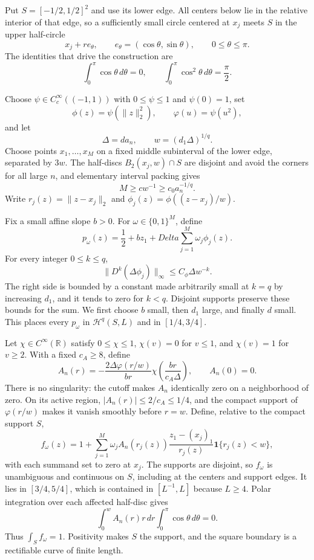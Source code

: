 Put \(S=[-1/2,1/2]^2\) and use its lower edge.  All centers below lie in the relative interior of that edge, so a sufficiently small circle centered at \(x_j\) meets \(S\) in the upper half-circle
\[
 x_j+r e_\theta,\qquad e_\theta=(\cos\theta,\sin\theta),
 \qquad 0\leq\theta\leq\pi.
\]
The identities that drive the construction are
\[
 \int_0^\pi\cos\theta\,d\theta=0,
 \qquad
 \int_0^\pi\cos^2\theta\,d\theta=\frac\pi2.
\]

Choose \(\psi\in C_c^\infty((-1,1))\) with \(0\leq\psi\leq1\) and \(\psi(0)=1\), set
\[
 \phi(z)=\psi(\lVert z\rVert_2^2),
 \qquad \varphi(u)=\psi(u^2),
\]
and let
\[
 \Delta=d a_n,
 \qquad w=(d_1\Delta)^{1/q}.
\]
Choose points \(x_1,\ldots,x_M\) on a fixed middle subinterval of the lower edge, separated by \(3w\).  The half-discs \(B_2(x_j,w)\cap S\) are disjoint and avoid the corners for all large \(n\), and elementary interval packing gives
\[
 M\geq c w^{-1}\geq c_0a_n^{-1/q}.
\]
Write \(r_j(z)=\lVert z-x_j\rVert_2\) and \(\phi_j(z)=\phi((z-x_j)/w)\).

Fix a small affine slope \(b>0\).  For \(\omega\in\{0,1\}^M\), define
\[
 p_\omega(z)=\frac12+bz_1+Delta\sum_{j=1}^M\omega_j\phi_j(z).
\]
For every integer \(0\leq k\leq q\),
\[
 \lVert D^k(\Delta\phi_j)\rVert_\infty
 \leq C_\phi\Delta w^{-k}.
\]
The right side is bounded by a constant made arbitrarily small at \(k=q\) by increasing \(d_1\), and it tends to zero for \(k<q\).  Disjoint supports preserve these bounds for the sum.  We first choose \(b\) small, then \(d_1\) large, and finally \(d\) small.  This places every \(p_\omega\) in \(\mathcal H^q(S,L)\) and in \([1/4,3/4]\).

Let \(\chi\in C^\infty(\mathbb R)\) satisfy \(0\leq\chi\leq1\), \(\chi(v)=0\) for \(v\leq1\), and \(\chi(v)=1\) for \(v\geq2\).  With a fixed \(c_A\geq8\), define
\[
 A_n(r)=-\frac{2\Delta\varphi(r/w)}{br}
 \chi\!\left(\frac{br}{c_A\Delta}\right),
 \qquad A_n(0)=0.
\]
There is no singularity: the cutoff makes \(A_n\) identically zero on a neighborhood of zero.  On its active region, \(|A_n(r)|\leq2/c_A\leq1/4\), and the compact support of \(\varphi(r/w)\) makes it vanish smoothly before \(r=w\).  Define, relative to the compact support \(S\),
\[
 f_\omega(z)=1+\sum_{j=1}^M\omega_j A_n(r_j(z))
 \frac{z_1-(x_j)_1}{r_j(z)}\mathbf1\{r_j(z)<w\},
\]
with each summand set to zero at \(x_j\).  The supports are disjoint, so \(f_\omega\) is unambiguous and continuous on \(S\), including at the centers and support edges.  It lies in \([3/4,5/4]\), which is contained in \([L^{-1},L]\) because \(L\geq4\).  Polar integration over each affected half-disc gives
\[
 \int_0^w A_n(r)r\,dr\int_0^\pi\cos\theta\,d\theta=0.
\]
Thus \(\int_S f_\omega=1\).  Positivity makes \(S\) the support, and the square boundary is a rectifiable curve of finite length.

